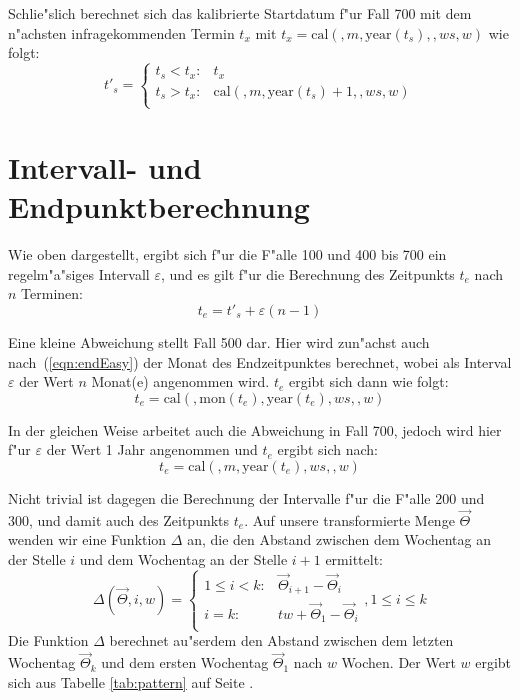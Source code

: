 \documentclass[a4paper]{article}
\newcommand*{\monf}{\mathrm{mon}}
\newcommand*{\yearf}{\mathrm{year}}
\newcommand*{\calf}{\mathrm{cal}}
\numberwithin{equation}{section}
\begin{document}
\noindent Schlie"slich berechnet sich das kalibrierte Startdatum f"ur Fall 700
mit dem n"achsten infragekommenden Termin $t_x$ mit
$t_x = \calf(, m, \yearf(t_s), , ws, w)$ wie folgt:
\begin{equation}
t'_s = \left\{\begin{array}{ll}
t_s < t_x : & t_x \\
t_s > t_x : & \calf(, m, \yearf(t_s) + 1, , ws, w) \\
\end{array}\right.
\end{equation}



%
%
%
%
\section{Intervall- und Endpunktberechnung}
\noindent Wie oben dargestellt, ergibt sich f"ur die F"alle 100 und 400 bis 700
ein regelm"a"siges Intervall $\varepsilon$, und es gilt f"ur die Berechnung des
Zeitpunkts $t_e$ nach $n$ Terminen:
\begin{equation}\label{eqn:endEasy}
  t_e = t'_s + \varepsilon(n - 1)
\end{equation}

\noindent Eine kleine Abweichung stellt Fall 500 dar. Hier wird zun"achst auch
nach~(\ref{eqn:endEasy}) der Monat des Endzeitpunktes berechnet, wobei als
Interval $\varepsilon$ der Wert $n$ Monat(e) angenommen wird. $t_e$ ergibt sich
dann wie folgt:
\begin{equation}t_e = \calf(, \monf(t_e), \yearf(t_e), ws, , w)\end{equation}

\noindent In der gleichen Weise arbeitet auch die Abweichung in Fall 700, jedoch
wird hier f"ur $\varepsilon$ der Wert 1 Jahr angenommen und $t_e$ ergibt sich
nach:
\begin{equation}t_e = \calf(, m, \yearf(t_e), ws, , w)\end{equation}

\noindent Nicht trivial ist dagegen die Berechnung der Intervalle f"ur die
F"alle 200 und 300, und damit auch des Zeitpunkts $t_e$. Auf unsere
transformierte Menge $\vec{\Theta}$ wenden wir eine Funktion $\Delta$ an, die
den Abstand zwischen dem Wochentag an der Stelle $i$ und dem Wochentag an der
Stelle $i+1$ ermittelt:
\begin{equation}
\Delta(\vec{\Theta}, i, w) = \left\{\begin{array}{ll}
1 \le i < k : & \vec{\Theta}_{i+1} - \vec{\Theta}_i \\
i = k : & tw + \vec{\Theta}_{1} - \vec{\Theta}_{i} \\
\end{array}\right., 1 \le i \le k
\end{equation}
Die Funktion $\Delta$ berechnet au"serdem den Abstand zwischen dem letzten
Wochentag $\vec{\Theta}_k$ und dem ersten Wochentag $\vec{\Theta}_1$ nach $w$
Wochen. Der Wert $w$ ergibt sich aus Tabelle \ref{tab:pattern} auf Seite
\pageref{tab:pattern}.
\end{document}
